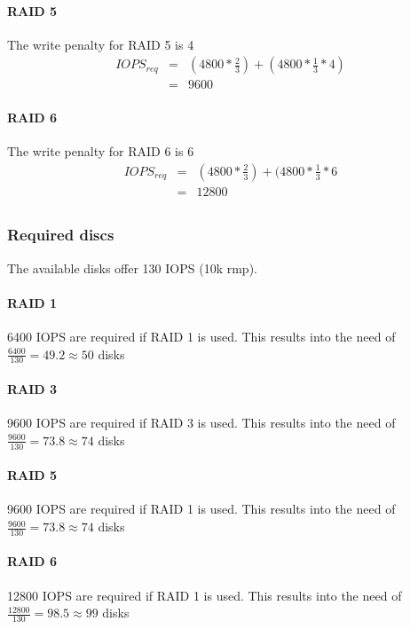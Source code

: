 \documentclass{article}
\begin{document}
\paragraph{RAID 5}
The write penalty for RAID 5 is 4
\begin{eqnarray*}
	IOPS_{req} &=&  (4800 * \frac{2}{3}) + (4800 * \frac{1}{3} * 4)  \\
		   &=&  9600
\end{eqnarray*}

\paragraph{RAID 6}
The write penalty for RAID 6 is 6
\begin{eqnarray*}
	IOPS_{req} &=&  (4800 * \frac{2}{3}) + (4800 * \frac{1}{3} * 6  \\
		   &=&  12800
\end{eqnarray*}
\subsection{}
\subsubsection*{Required discs}
The available disks offer 130 IOPS (10k rmp).
\paragraph{RAID 1}
6400 IOPS are required if RAID 1 is used. This results into the need of $\frac{6400}{130} = 49.2 \approx 50$ disks
\paragraph{RAID 3}
9600 IOPS are required if RAID 3 is used. This results into the need of $\frac{9600}{130} = 73.8 \approx 74$ disks
\paragraph{RAID 5}
9600 IOPS are required if RAID 1 is used. This results into the need of $\frac{9600}{130} = 73.8 \approx 74$ disks
\paragraph{RAID 6}
12800 IOPS are required if RAID 1 is used. This results into the need of $\frac{12800}{130} = 98.5 \approx 99$ disks
\end{document}
